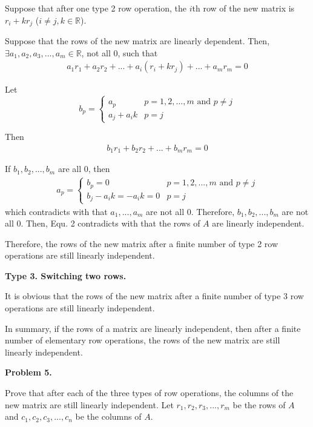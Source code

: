 \documentclass[12pt]{article}
\begin{document}
Suppose that after one type 2 row operation, the $i$th row of the new matrix is $r_i+kr_j$ ($i\ne j, k\in \mathbb{R}$). 

Suppose that the rows of the new matrix are linearly dependent. Then, $\exists a_1, a_2, a_3, ... , a_m \in \mathbb{R}$, not all 0, such that
\begin{gather}
    a_1r_1 + a_2r_2 + ... + a_i(r_i+kr_j) + ... + a_mr_m = 0
\end{gather}

Let
$$
    b_p = 
    \begin{cases}
    a_p & p=1,2, ... ,m \text{~and~} p \ne j \\
    a_j+a_ik & p = j
    \end{cases}
$$

Then
\begin{gather*}
    b_1r_1 + b_2r_2 + ... + b_mr_m = 0 \tag{2}
\end{gather*}

If $b_1, b_2, ..., b_m$ are all 0, then
\begin{gather*}
a_p = \begin{cases}
   b_p = 0 & p=1,2, ... ,m \text{~and~} p \ne j \\
   b_j - a_ik = - a_ik = 0 & p=j
   \end{cases} \tag{3}
\end{gather*}
which contradicts with that $a_1, ... , a_m $ are not all 0. Therefore, $b_1, b_2, ..., b_m$ are not all 0. Then, Equ. 2 contradicts with that the rows of $A$ are linearly independent.



Therefore, the rows of the new matrix after a finite number of type 2 row operations are still linearly independent.

\vspace{\baselineskip}
\textbf{Type 3. Switching two rows.}

It is obvious that the rows of the new matrix after a finite number of type 3 row operations are still linearly independent.

\vspace{\baselineskip}
In summary, if the rows of a matrix are linearly independent, then after a finite number of elementary row operations, the rows of the new matrix are still linearly independent.

\vspace{\baselineskip}
\noindent
\textbf{Problem 5.}

Prove that after each of the three types of row operations, the columns of the new matrix are still linearly independent. Let $r_1, r_2, r_3, ... , r_m$ be the rows of $A$ and $c_1, c_2, c_3, ... , c_n$ be the columns of $A$. 
\end{document}
